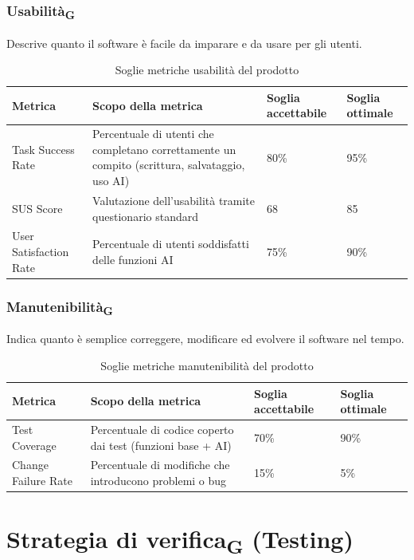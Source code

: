 \documentclass[11pt,a4paper]{article}
\newcommand{\gls}[1]{#1\textsubscript{G}}
\begin{document}
\subsubsection{Usabilità\textsubscript{G}}
Descrive quanto il software è facile da imparare e da usare per gli utenti.
\begin{table}[H]
\centering
\renewcommand{\arraystretch}{1.5}
\begin{tabular}{|M{0.25\textwidth}|M{0.35\textwidth}|M{0.15\textwidth}|M{0.15\textwidth}|}
\hline
\textbf{Metrica} & \textbf{Scopo della metrica} & \textbf{Soglia accettabile} & \textbf{Soglia ottimale} \\
\hline
Task Success Rate & Percentuale di utenti che completano correttamente un compito (scrittura, salvataggio, uso AI) & 80\% & 95\% \\ \hline
SUS Score & Valutazione dell’usabilità tramite questionario standard & 68 & 85 \\ \hline
User Satisfaction Rate & Percentuale di utenti soddisfatti delle funzioni AI & 75\% & 90\% \\
\hline
\end{tabular}
\caption{Soglie metriche usabilità del prodotto}
\end{table}

\subsubsection{Manutenibilità\textsubscript{G}}
Indica quanto è semplice correggere, modificare ed evolvere il software nel tempo.
\begin{table}[H]
\centering
\renewcommand{\arraystretch}{1.5}
\begin{tabular}{|M{0.25\textwidth}|M{0.35\textwidth}|M{0.15\textwidth}|M{0.15\textwidth}|}
\hline
\textbf{Metrica} & \textbf{Scopo della metrica} & \textbf{Soglia accettabile} & \textbf{Soglia ottimale} \\
\hline
Test Coverage & Percentuale di codice coperto dai test (funzioni base + AI) & 70\% & 90\% \\ \hline
Change Failure Rate & Percentuale di modifiche che introducono problemi o bug & 15\% & 5\% \\
\hline
\end{tabular}
\caption{Soglie metriche manutenibilità del prodotto}
\end{table}

\newpage
\section{Strategia di \gls{verifica} (Testing)}
\end{document}
